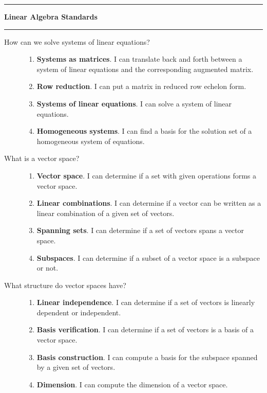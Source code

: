 \documentclass{article}
\begin{document}
\pagestyle{empty}
\noindent \course \hfill \sem \hfill \prof
\vspace{0.3in}
\hrule
\begin{center}{\large \bf Linear Algebra Standards}\end{center}
\hrule


\begin{description}
\item[How can we solve systems of linear equations?] \hfill
\begin{enumerate}
\item {\bf Systems as matrices}. I can translate back and forth between a system of linear equations and the corresponding augmented matrix.
\item {\bf Row reduction}.  I can put a matrix in reduced row echelon form.
\item {\bf Systems of linear equations}. I can solve a system of linear equations.
\item {\bf Homogeneous systems}. I can find a basis for the solution set of a homogeneous system of equations.
\end{enumerate}

\item[What is a vector space?] \hfill
\begin{enumerate}
\item {\bf Vector space}. I can determine if a set with given operations forms a vector space.
\item {\bf Linear combinations}. I can determine if a vector can be written as a linear combination of a given set of vectors.
\item {\bf Spanning sets}. I can determine if a set of vectors spans a vector space.
\item {\bf Subspaces}. I can determine if a subset of a vector space is a subspace or not.

\end{enumerate}

\item [What structure do vector spaces have?] \hfill
\begin{enumerate}

\item {\bf Linear independence}. I can determine if a set of vectors is linearly dependent or independent.
\item {\bf Basis verification}. I can determine if a set of vectors is a basis of a vector space.
\item {\bf Basis construction}.  I can compute a basis for the subspace spanned by a given set of vectors.
\item {\bf Dimension}.  I can compute the dimension of a vector space.
\end{enumerate}


\end{description}
\end{document}
